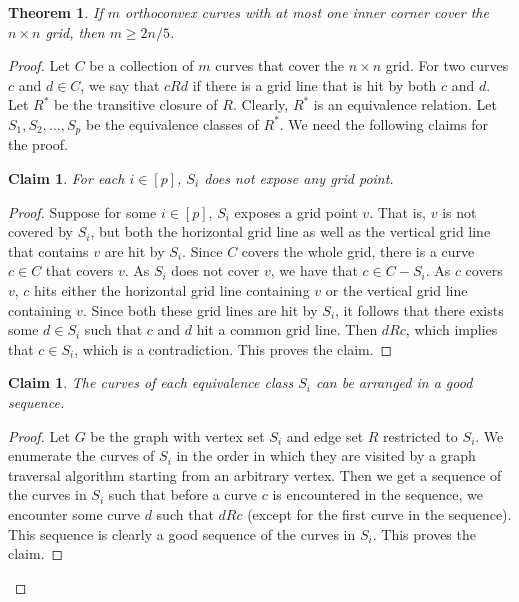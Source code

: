 \documentclass[
final
]{dmtcs-episciences}
\numberwithin{equation}{subsection}
\newtheorem{thm}[defn]{Theorem}%
\newtheorem{clm}[defn]{Claim}
\begin{document}
\begin{thm}
	If $m$ orthoconvex curves with at most one inner corner cover the $n\times n$ grid, then $m \geq 2n/5$.
	\label{thm:orthoconv}
\end{thm}
\begin{proof}
	Let $C$ be a collection of $m$ curves that cover the $n \times n$ grid. For two curves $c$ and $d \in C$, we say that $c R d$ if there is a grid line that is hit by both $c$ and $d$. Let $R^*$ be the transitive closure of $R$. Clearly, $R^*$ is an equivalence relation. Let $S_1, S_2, \ldots , S_p$ be the equivalence classes of $R^*$. We need the following claims for the proof.
	
	\begin{clm} For each $i \in [p]$, $S_i$ does not expose any grid point.
		\label{clm:1}
	\end{clm}
	\begin{proof}
		Suppose for some $i \in [p]$, $S_i$ exposes a grid point $v$. That is, $v$ is not covered by $S_i$, but both the horizontal grid line as well as the vertical grid line that contains $v$ are hit by $S_i$. Since $C$ covers the whole grid, there is a curve $c \in C$ that covers $v$. As $S_i$ does not cover $v$, we have that $c \in C - S_i$. As $c$ covers $v$, $c$ hits either the horizontal grid line containing $v$ or the vertical grid line containing $v$. Since both these grid lines are hit by $S_i$, it follows that there exists some $d \in S_i$ such that $c$ and $d$ hit a common grid line. Then $d R c$, which implies that $c \in S_i$, which is a contradiction. This proves the claim.
	\end{proof}
	\begin{clm}
		The curves of each equivalence class $S_i$ can be arranged in a good sequence.
		\label{clm:2}
	\end{clm}
	\begin{proof}
		Let $G$ be the graph with vertex set $S_i$ and edge set $R$ restricted to $S_i$. We enumerate the curves of $S_i$ in the order in which they are visited by a graph traversal algorithm starting from an arbitrary vertex. Then we get a sequence of the curves in $S_i$ such that before a curve $c$ is encountered in the sequence, we encounter some curve $d$ such that $d R c$ (except for the first curve in the sequence). This sequence is clearly a good sequence of the curves in $S_i$. This proves the claim.
	\end{proof}

\end{proof}
\end{document}
